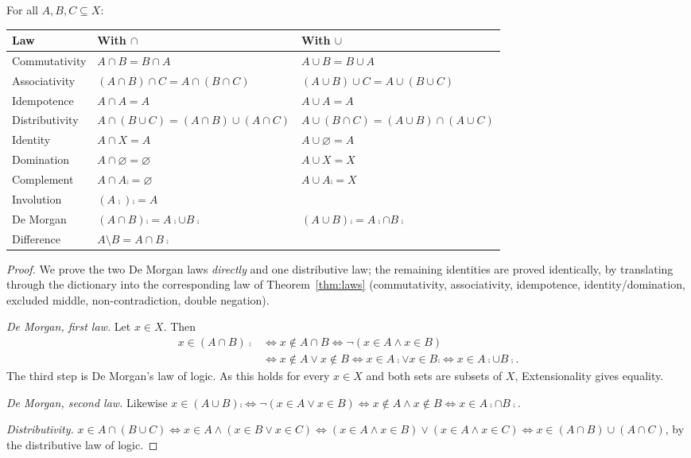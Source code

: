 \begin{theorem}\label{thm:setlaws}
	For all $A,B,C\subseteq X$:
	\begin{center}
		\begin{tabular}{@{}p{3.8cm}p{5.4cm}p{5.4cm}@{}}
			\toprule
			\textbf{Law} & \textbf{With $\cap$} & \textbf{With $\cup$}\\
			\midrule
			Commutativity & $A\cap B=B\cap A$ & $A\cup B=B\cup A$\\
			Associativity & $(A\cap B)\cap C=A\cap(B\cap C)$ & $(A\cup B)\cup C=A\cup(B\cup C)$\\
			Idempotence & $A\cap A=A$ & $A\cup A=A$\\
			Distributivity & $A\cap(B\cup C)=(A\cap B)\cup(A\cap C)$ & $A\cup(B\cap C)=(A\cup B)\cap(A\cup C)$\\
			Identity & $A\cap X=A$ & $A\cup\varnothing=A$\\
			Domination & $A\cap\varnothing=\varnothing$ & $A\cup X=X$\\
			Complement & $A\cap A\comp=\varnothing$ & $A\cup A\comp=X$\\
			Involution & \multicolumn{2}{l}{$(A\comp)\comp=A$}\\
			De Morgan & $(A\cap B)\comp=A\comp\cup B\comp$ & $(A\cup B)\comp=A\comp\cap B\comp$\\
			Difference & \multicolumn{2}{l}{$A\setminus B=A\cap B\comp$}\\
			\bottomrule
		\end{tabular}
	\end{center}
\end{theorem}
\begin{proof}
	We prove the two De Morgan laws \emph{directly} and one distributive law; the remaining identities are proved identically, by translating through the dictionary into the corresponding law of Theorem~\ref{thm:laws} (commutativity, associativity, idempotence, identity/domination, excluded middle, non-contradiction, double negation).
	
	\emph{De Morgan, first law.} Let $x\in X$. Then
	\begin{align*}
		x\in(A\cap B)\comp&\iff x\notin A\cap B\iff\neg(x\in A\wedge x\in B)\\
		&\iff x\notin A\vee x\notin B\iff x\in A\comp\vee x\in B\comp\iff x\in A\comp\cup B\comp.
	\end{align*}
	The third step is De Morgan's law of logic. As this holds for every $x\in X$ and both sets are subsets of $X$, Extensionality gives equality.
	
	\emph{De Morgan, second law.} Likewise $x\in(A\cup B)\comp\iff\neg(x\in A\vee x\in B)\iff x\notin A\wedge x\notin B\iff x\in A\comp\cap B\comp$.
	
	\emph{Distributivity.} $x\in A\cap(B\cup C)\iff x\in A\wedge(x\in B\vee x\in C)\iff(x\in A\wedge x\in B)\vee(x\in A\wedge x\in C)\iff x\in(A\cap B)\cup(A\cap C)$, by the distributive law of logic.
\end{proof}

